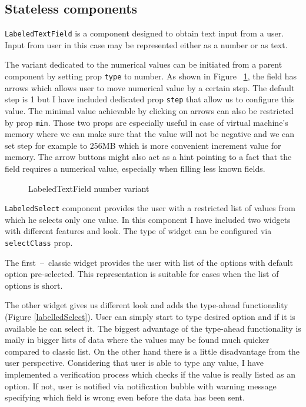 \subsection{Stateless components}
\texttt{LabeledTextField} is a component designed to obtain text input from a user. Input from user in this case may be represented either as a number or as text.

The variant dedicated to the numerical values can be initiated from a parent component by setting prop \texttt{type} to number. As shown in Figure~ \ref{labelledTextField}, the field has arrows which allows user to move numerical value by a certain step. The default step is 1 but I have included dedicated prop \texttt{step} that allow us to configure this value. The minimal value achievable by clicking on arrows can also be restricted by prop \texttt{min}. Those two props are especially useful in case of virtual machine's memory where we can make sure that the value will not be negative and we can set step for example to 256MB which is more convenient increment value for memory. 
The arrow buttons might also act as a hint pointing to a fact that the field requires a numerical value, especially when filling less known fields.

\begin{figure}[h]
\caption{LabeledTextField number variant}
\label{labelledTextField}
\end{figure} 

\texttt{LabeledSelect} component provides the user with a restricted list of values from which he selects only one value. In this component I have included two widgets with different features and look. The type of widget can be configured via \texttt{selectClass} prop. 

The first~--~classic widget provides the user with list of the options with default option pre-selected. This representation is suitable for cases when the list of options is short.

The other widget gives us different look and adds the type-ahead functionality (Figure \ref{labelledSelect}). User can simply start to type desired option and if it is available he can select it. The biggest advantage of the type-ahead functionality is maily in bigger lists of data where the values may be found much quicker compared to classic list. On the other hand there is a little disadvantage from the user perspective. Considering that user is able to type any value, I have implemented a verification process which checks if the value is really listed as an option. If not, user is notified via notification bubble with warning message specifying which field is wrong even before the data has been sent.

